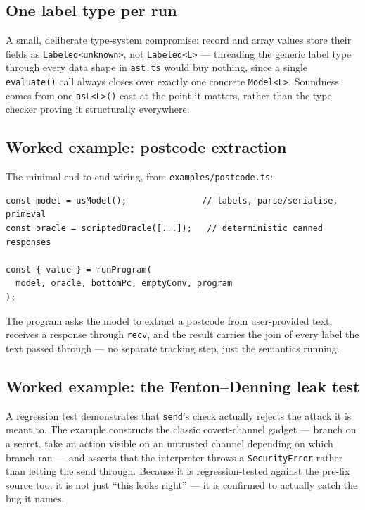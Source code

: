 \documentclass[11pt, a4paper]{article}
\begin{document}
\begin{descirption}
{\subsection{One label type per run}

A small, deliberate type-system compromise: record and array values store
their fields as \lstinline{Labeled<unknown>}, not \lstinline{Labeled<L>}
--- threading the generic label type through every data shape in
\texttt{ast.ts} would buy nothing, since a single \lstinline{evaluate()}
call always closes over exactly one concrete \lstinline{Model<L>}.
Soundness comes from one \lstinline{asL<L>()} cast at the point it
matters, rather than the type checker proving it structurally everywhere.

\subsection{Worked example: postcode extraction}

The minimal end-to-end wiring, from \texttt{examples/postcode.ts}:

\begin{lstlisting}
const model = usModel();               // labels, parse/serialise, primEval
const oracle = scriptedOracle([...]);   // deterministic canned responses

const { value } = runProgram(
  model, oracle, bottomPc, emptyConv, program
);
\end{lstlisting}

The program asks the model to extract a postcode from user-provided text,
receives a response through \lstinline{recv}, and the result carries the
join of every label the text passed through --- no separate tracking
step, just the semantics running.

\subsection{Worked example: the Fenton--Denning leak test}

A regression test demonstrates that \lstinline{send}'s check actually
rejects the attack it is meant to. The example constructs the classic
covert-channel gadget --- branch on a secret, take an action visible on an
untrusted channel depending on which branch ran --- and asserts that the
interpreter throws a \lstinline{SecurityError} rather than letting the
send through. Because it is regression-tested against the pre-fix source
too, it is not just ``this looks right'' --- it is confirmed to actually
catch the bug it names.

}
\end{descirption}
\end{document}
